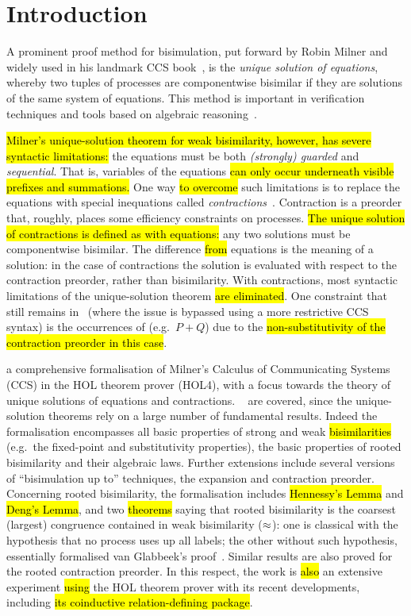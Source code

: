 \section{Introduction}

A prominent proof method for bisimulation, put forward by Robin Milner and widely used in his
landmark CCS book~\cite{Mil89}, is the
\emph{unique solution of equations}, whereby two tuples of processes are
componentwise bisimilar if they are solutions of the same system of equations.
This method is important in verification techniques and tools
based on algebraic reasoning~\cite{BaeBOOK,theoryAndPractice,RosUnder10}. 

\hl{Milner's unique-solution theorem for weak bisimilarity, however,
has severe syntactic limitations:}
the equations must be both \emph{(strongly) guarded} and \emph{sequential}. That is,
variables of the equations \hl{can only occur underneath visible prefixes and summations.}
One way \hl{to overcome} such limitations is to replace the equations
with special inequations called
\emph{contractions}~\cite{sangiorgi2015equations,sangiorgi2017equations}. Contraction is a
preorder that, roughly, places some efficiency constraints on processes.
\hl{The unique solution of contractions is defined as with equations:}
any two solutions must be componentwise bisimilar.
The difference \hl{from} equations is  the meaning of a solution:
in the case of contractions the solution is evaluated with respect to
the contraction preorder, rather than bisimilarity. 
With contractions, most syntactic limitations of the unique-solution theorem \hl{are
eliminated}. One constraint that still remains
in~\cite{sangiorgi2017equations}
(where the issue is bypassed using a more
restrictive CCS syntax)
is the occurrences of %
 (e.g.~$P + Q$) due to
the \hl{non-substitutivity of the contraction preorder in this case}.

   a
comprehensive formalisation of Milner's Calculus of Communicating
Systems (CCS) in the HOL theorem prover (HOL4),
with a focus towards the theory of unique solutions of equations and contractions.
~\cite{Mil89} are covered, since
the unique-solution theorems rely on a large number of fundamental results.
Indeed the formalisation encompasses all basic properties of strong and weak
\hl{bisimilarities} (e.g.~the fixed-point and substitutivity properties), the
basic properties of rooted bisimilarity and their algebraic laws.
Further extensions include several versions of ``bisimulation up to''
techniques, the expansion and contraction preorder.
Concerning rooted bisimilarity, the formalisation
includes \hl{Hennessy's Lemma} and \hl{Deng's Lemma},
 and two \hl{theorems} saying that rooted bisimilarity is the coarsest (largest)
 congruence contained in weak bisimilarity ($\approx$): one is classical
 with the hypothesis that no process uses up all labels;
the other without such hypothesis, essentially formalised van Glabbeek's proof~\cite{van2005characterisation}.
Similar results are also proved for the rooted contraction preorder.
In this respect, the work is \hl{also} an extensive experiment \hl{using} the HOL theorem prover with its
recent developments, including \hl{its coinductive relation-defining package}.

